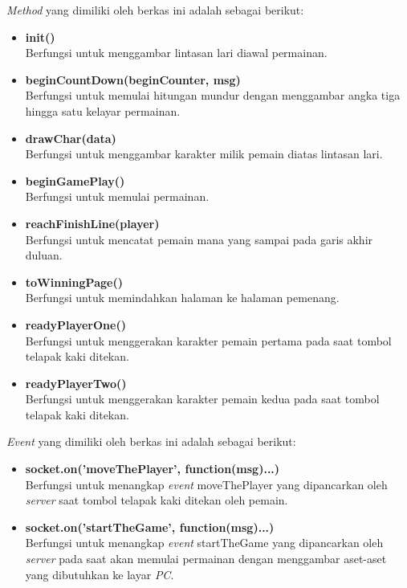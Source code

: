 \begin{enumerate}
\begin{enumerate}
\begin{enumerate}
			\textit{Method} yang dimiliki oleh berkas ini adalah sebagai berikut:
			\begin{itemize}
				\item \textbf{init()} \\
				Berfungsi untuk menggambar lintasan lari diawal permainan.
				
				\item \textbf{beginCountDown(beginCounter, msg)} \\
				Berfungsi untuk memulai hitungan mundur dengan menggambar angka tiga hingga satu kelayar permainan.
				
				\item \textbf{drawChar(data)} \\
				Berfungsi untuk menggambar karakter milik pemain diatas lintasan lari.
				
				\item \textbf{beginGamePlay()} \\
				Berfungsi untuk memulai permainan.
				
				\item \textbf{reachFinishLine(player)} \\
				Berfungsi untuk mencatat pemain mana yang sampai pada garis akhir duluan.
				
				\item \textbf{toWinningPage()} \\
				Berfungsi untuk memindahkan halaman ke halaman pemenang.
				
				\item \textbf{readyPlayerOne()} \\
				Berfungsi untuk menggerakan karakter pemain pertama pada saat tombol telapak kaki ditekan.
				
				\item \textbf{readyPlayerTwo()} \\
				Berfungsi untuk menggerakan karakter pemain kedua pada saat tombol telapak kaki ditekan.
			\end{itemize}
			
			\textit{Event} yang dimiliki oleh berkas ini adalah sebagai berikut:
			\begin{itemize}
				\item \textbf{socket.on('moveThePlayer', function(msg){...})}\\
				Berfungsi untuk menangkap \textit{event} moveThePlayer yang dipancarkan oleh \textit{server} saat tombol telapak kaki ditekan oleh pemain.
				
				\item \textbf{socket.on('startTheGame', function(msg){...})}\\
				Berfungsi untuk menangkap \textit{event} startTheGame yang dipancarkan oleh \textit{server} pada saat akan memulai permainan dengan menggambar aset-aset yang dibutuhkan ke layar \textit{PC}.
				

\end{itemize}
\end{enumerate}
\end{enumerate}
\end{enumerate}
